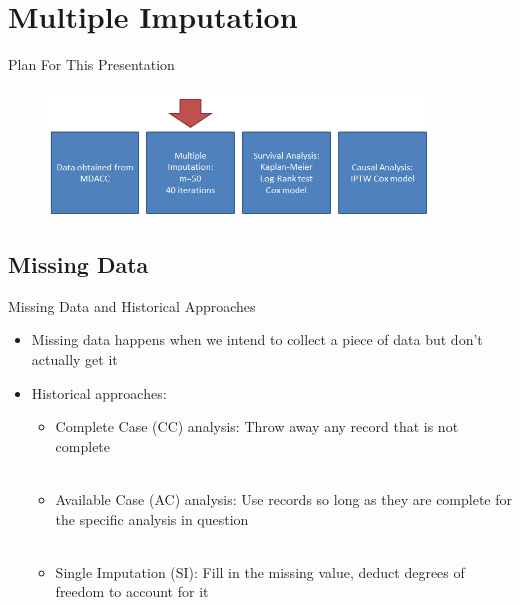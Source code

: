 \section{Multiple Imputation}
\begin{frame}[noframenumbering]{Plan For This Presentation}
  \begin{figure}[h!]
  \centering
    \includegraphics[width=0.9\textwidth]{mi_flow}
\label{fig:mi_flow}
\end{figure} 
\end{frame}

\subsection{Missing Data}
\begin{frame}{Missing Data and Historical Approaches}
 \begin{itemize}
 \item Missing data happens when we intend to collect a piece of data but don't actually get it
 \item Historical approaches:
 \begin{itemize}
  \item Complete Case (CC) analysis: Throw away any record that is not complete\\~\\
 \item Available Case (AC) analysis: Use records so long as they are 
 complete for the specific analysis in question\\~\\
 \item Single Imputation (SI): Fill in the missing value, deduct degrees of freedom to account for it
 \end{itemize}
 \end{itemize}
 
\end{frame}

